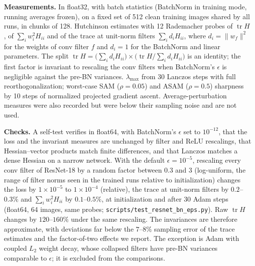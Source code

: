 \documentclass[10pt]{article}
\theoremstyle{remark}
\newcommand{\tr}{\operatorname{tr}}
\begin{document}
\textbf{Measurements.} In float32, with batch statistics (BatchNorm in training mode, running averages frozen), on a fixed set of 512 clean training images shared by all runs, in chunks of 128. Hutchinson estimates with 12 Rademacher probes of $\tr H$, of $\sum_iw_i^2H_{ii}$ and of the trace at unit-norm filters $\sum_id_iH_{ii}$, where $d_i=\|w_f\|^2$ for the weights of conv filter $f$ and $d_i=1$ for the BatchNorm and linear parameters. The split $\tr H=\big(\sum_id_iH_{ii}\big)\times\big(\tr H/\sum_id_iH_{ii}\big)$ is an identity; the first factor is invariant to rescaling the conv filters when BatchNorm's $\epsilon$ is negligible against the pre-BN variances. $\lambda_{\max}$ from 30 Lanczos steps with full reorthogonalization; worst-case SAM ($\rho=0.05$) and ASAM ($\rho=0.5$) sharpness by 10 steps of normalized projected gradient ascent. Average-perturbation measures were also recorded but were below their sampling noise and are not used.

\textbf{Checks.} A self-test verifies in float64, with BatchNorm's $\epsilon$ set to $10^{-12}$, that the loss and the invariant measures are unchanged by filter and ReLU rescalings, that Hessian--vector products match finite differences, and that Lanczos matches a dense Hessian on a narrow network. With the default $\epsilon=10^{-5}$, rescaling every conv filter of ResNet-18 by a random factor between $0.3$ and $3$ (log-uniform, the range of filter norms seen in the trained runs relative to initialization) changes the loss by $1\times10^{-5}$ to $1\times10^{-4}$ (relative), the trace at unit-norm filters by $0.2$--$0.3\%$ and $\sum_iw_i^2H_{ii}$ by $0.1$--$0.5\%$, at initialization and after 30 Adam steps (float64, 64 images, same probes; \texttt{scripts/test\_resnet\_bn\_eps.py}). Raw $\tr H$ changes by $120$--$160\%$ under the same rescaling. The invariances are therefore approximate, with deviations far below the $7$--$8\%$ sampling error of the trace estimates and the factor-of-two effects we report. The exception is Adam with coupled $L_2$ weight decay, whose collapsed filters have pre-BN variances comparable to $\epsilon$; it is excluded from the comparisons.
\end{document}
